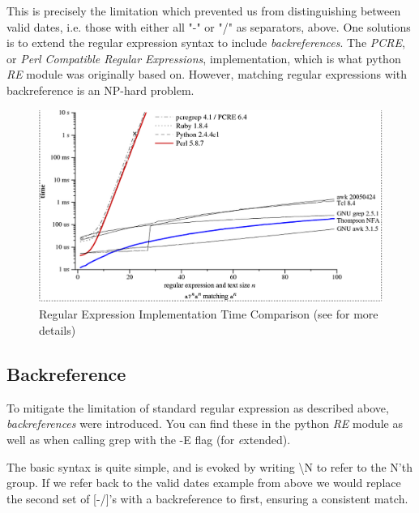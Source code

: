 
This is precisely the limitation which prevented us from distinguishing between valid dates, i.e. those with either all "-" or "/" as separators, above.  One solutions is to extend the regular expression syntax to include \textit{backreferences}. The \textit{PCRE}, or \textit{Perl Compatible Regular Expressions}, implementation, which is what python \textit{RE} module was originally based on. However, matching regular expressions with backreference is an NP-hard problem.

\begin{figure}
  \includegraphics[width=\textwidth]{../images/RegExAlg}
  \caption{Regular Expression Implementation Time Comparison (see \cite{RegExComp} for more details)}
  \label{regex:regexALg}
\end{figure}






\subsection{Backreference} 

To mitigate the limitation of standard regular expression as described above, \textit{backreferences} were introduced. You can find these in the python \textit{RE} module as well as when calling grep with the -E flag (for \textit extended).

The basic syntax is quite simple, and is evoked by writing \textbackslash N to refer to the N'th group. If we refer back to the valid dates example from above we would replace the second set of [-/]'s with a backreference to first, ensuring a consistent match.

